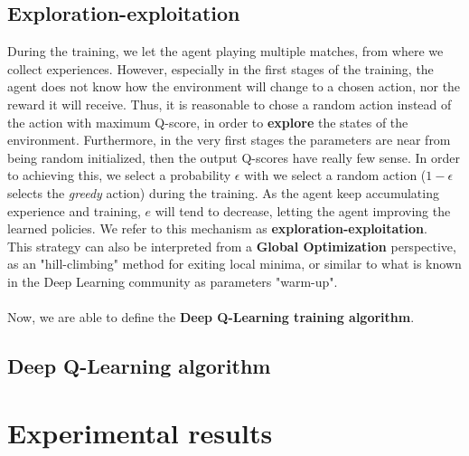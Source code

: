\documentclass{article}
\begin{document}
\subsection{Exploration-exploitation}
During the training, we let the agent playing multiple matches, from where we collect experiences. However, especially in the first stages of the training, the agent does not know how the environment will change to a chosen action, nor the reward it will receive. Thus, it is reasonable to chose a random action instead of the action with maximum Q-score, in order to \textbf{explore} the states of the environment. Furthermore, in the very first stages the parameters are near from being random initialized, then the output Q-scores have really few sense. In order to achieving this, we select a probability $\epsilon$ with we select a random action ($1 - \epsilon$ selects the \textit{greedy} action) during the training. As the agent keep accumulating experience and training, $e$ will tend to decrease, letting the agent improving the learned policies. We refer to this mechanism as \textbf{exploration-exploitation}.\\
This strategy can also be interpreted from a \textbf{Global Optimization} perspective, as an "hill-climbing" method for exiting local minima, or similar to what is known in the Deep Learning community as parameters "warm-up".
\\
\\
Now, we are able to define the \textbf{Deep Q-Learning training algorithm}.
\subsection{Deep Q-Learning algorithm}


\section{Experimental results}
\end{document}
